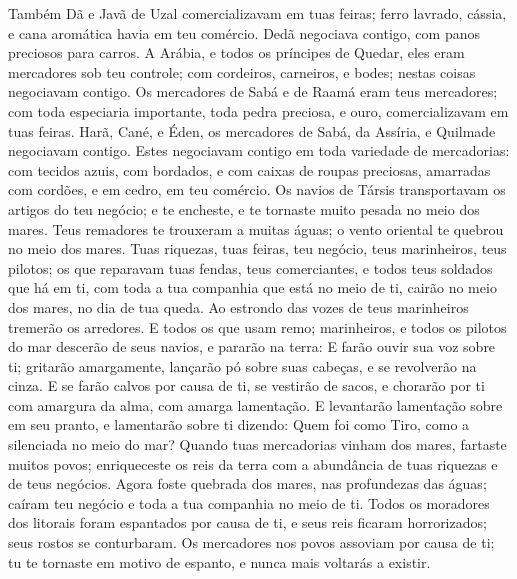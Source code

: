 {Também Dã e Javã de Uzal comercializavam em tuas feiras; ferro lavrado, cássia, e cana aromática havia em teu comércio.
Dedã negociava contigo, com panos preciosos para carros.
A Arábia, e todos os príncipes de Quedar, eles eram mercadores sob teu controle; com cordeiros, carneiros, e bodes; nestas coisas negociavam contigo.
Os mercadores de Sabá e de Raamá eram teus mercadores; com toda especiaria importante, toda pedra preciosa, e ouro, comercializavam em tuas feiras.
Harã, Cané, e Éden, os mercadores de Sabá, da Assíria, e Quilmade negociavam contigo.
Estes negociavam contigo em toda variedade de mercadorias: com tecidos azuis, com bordados, e com caixas de roupas preciosas, amarradas com cordões, e
{} em cedro, em teu comércio.
Os navios de Társis transportavam os artigos do teu negócio; e te encheste, e te tornaste muito pesada no meio dos mares.
Teus remadores te trouxeram a muitas águas; o vento oriental te quebrou no meio dos mares.
Tuas riquezas, tuas feiras, teu negócio, teus marinheiros, teus pilotos; os que reparavam tuas fendas, teus comerciantes, e todos teus soldados que há em ti, com toda a tua companhia que está no meio de ti, cairão no meio dos mares, no dia de tua queda.
Ao estrondo das vozes de teus marinheiros tremerão os arredores.
E todos os que usam remo; marinheiros, e todos os pilotos do mar descerão de seus navios, e pararão na terra:
E farão ouvir sua voz sobre ti; gritarão amargamente, lançarão pó sobre suas cabeças, e se revolverão na cinza.
E se farão calvos por causa de ti, se vestirão de sacos, e chorarão por ti com amargura da alma, com amarga lamentação.
E levantarão lamentação sobre em seu pranto, e lamentarão sobre ti dizendo: Quem foi como Tiro, como a
{} silenciada no meio do mar?
Quando tuas mercadorias vinham dos mares, fartaste muitos povos; enriqueceste os reis da terra com a abundância de tuas riquezas e de teus negócios.
Agora foste quebrada dos mares, nas profundezas das águas; caíram teu negócio e toda a tua companhia no meio de ti.
Todos os moradores dos litorais foram espantados por causa de ti, e seus reis ficaram horrorizados; seus rostos se conturbaram.
Os mercadores nos povos assoviam por causa de ti; tu te tornaste em motivo de espanto, e nunca mais voltarás a existir.

}
